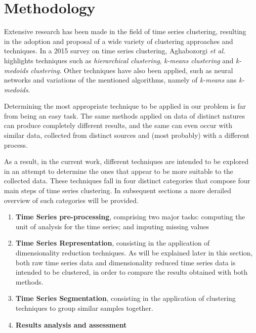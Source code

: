 \documentclass[9pt,journal,compsoc]{IEEEtran}
\begin{document}
\section{Methodology}
\label{methodology}

Extensive research has been made in the field of time series clustering, resulting in the adoption and proposal of a wide variety of clustering approaches and techniques. In a 2015 survey on time series clustering, Aghabozorgi \emph{et al.} \cite{aghabozorgi2015time} highlights techniques such as \emph{hierarchical clustering}, \emph{k-means clustering} and \emph{k-medoids clustering}. Other techniques have also been applied, such as neural networks and variations of the mentioned algorithms, namely of \emph{k-means} ans \emph{k-medoids}.

Determining the most appropriate technique to be applied in our problem is far from being an easy task. The same methods applied on data of distinct natures can produce completely different results, and the same can even occur with similar data, collected from distinct sources and (most probably) with a different process.

As a result, in the current work, different techniques are intended to be explored in an attempt to determine the ones that appear to be more suitable to the collected data. These techniques fall in four distinct categories that compose four main steps of time series clustering. In subsequent sections a more derailed overview of such categories will be provided.

\begin{enumerate}
	\item \textbf{Time Series pre-processing}, comprising two major tasks: computing the unit of analysis for the time series; and imputing missing values
	
	\item \textbf{Time Series Representation}, consisting in the application of dimensionality reduction techniques. As will be explained later in this section, both raw time series data and dimensionality reduced time series data is intended to be clustered, in order to compare the results obtained with both methods.
	
	\item \textbf{Time Series Segmentation}, consisting in the application of clustering techniques to group similar samples together.
	
	\item \textbf{Results analysis and assessment}
\end{enumerate}
 
\end{document}
